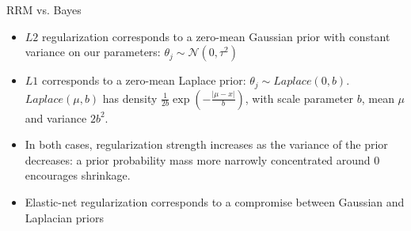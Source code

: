 \documentclass[11pt,compress,t,notes=noshow, xcolor=table]{beamer}
\begin{document}
\begin{vbframe} {RRM vs. Bayes}
{\footnotesize
\begin{itemize}
  \item $L2$ regularization corresponds to a zero-mean Gaussian prior with 
  constant variance on our parameters:
  $\theta_j \sim \mathcal{N}(0, \tau^2)$ 
  \item $L1$ corresponds to a zero-mean Laplace prior: 
  $\theta_j \sim \mathit{Laplace}(0,b)$.
  $\mathit{Laplace}(\mu, b)$ has density $\frac{1}{2b}\exp(-\frac{|\mu-x|}{b})$, 
  with scale parameter $b$, mean $\mu$ and variance $2b^2$.
  \item In both cases, regularization strength increases as the 
  variance of the prior decreases: a prior probability mass more narrowly 
  concentrated around 0 encourages shrinkage.
  \item Elastic-net regularization corresponds to a compromise between Gaussian and Laplacian priors 
\end{itemize}
 }
 
\end{vbframe}

\end{document}
